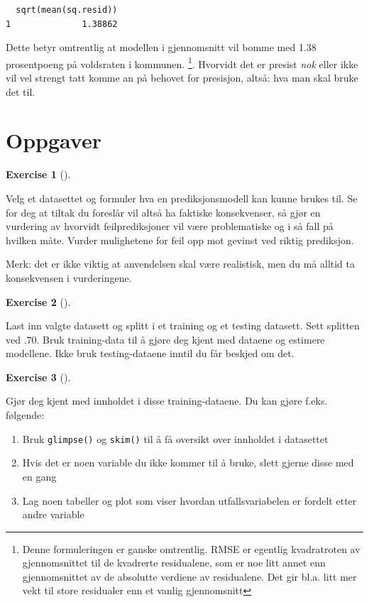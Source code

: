 \documentclass[
  letterpaper,
  DIV=11,
  numbers=noendperiod]{scrreprt}
\providecommand{\tightlist}{%
  \setlength{\itemsep}{0pt}\setlength{\parskip}{0pt}}\usepackage{longtable,booktabs,array}
\theoremstyle{definition}
\newtheorem{exercise}{Exercise}[chapter]
\theoremstyle{remark}
\begin{document}
\begin{verbatim}
  sqrt(mean(sq.resid))
1              1.38862
\end{verbatim}

Dette betyr omtrentlig at modellen i gjennomsnitt vil bomme med 1.38
prosentpoeng på voldsraten i kommunen. \footnote{Denne formuleringen er
  ganske omtrentlig. RMSE er egentlig kvadratroten av gjennomsnittet til
  de kvadrerte residualene, som er noe litt annet enn gjennomsnittet av
  de absolutte verdiene av residualene. Det gir bl.a. litt mer vekt til
  store residualer enn et vanlig gjennomsnitt}. Hvorvidt det er presist
\emph{nok} eller ikke vil vel strengt tatt komme an på behovet for
presisjon, altså: hva man skal bruke det til.

\hypertarget{oppgaver-1}{%
\section{Oppgaver}\label{oppgaver-1}}

\leavevmode{}%
\begin{exercise}[]\label{exr-ols-eksplisitt}

Velg et datasettet og formuler hva en prediksjonsmodell kan kunne brukes
til. Se for deg at tiltak du foreslår vil altså ha faktiske
konsekvenser, så gjør en vurdering av hvorvidt feilprediksjoner vil være
problematiske og i så fall på hvilken måte. Vurder mulighetene for feil
opp mot gevinst ved riktig prediksjon.

Merk: det er ikke viktig at anvendelsen skal være realistisk, men du må
alltid ta konsekvensen i vurderingene.

\end{exercise}

\leavevmode{}%
\begin{exercise}[]\label{exr-split}

Last inn valgte datasett og splitt i et training og et testing datasett.
Sett splitten ved .70. Bruk training-data til å gjøre deg kjent med
dataene og estimere modellene. Ikke bruk testing-dataene inntil du får
beskjed om det.

\end{exercise}

\leavevmode{}%
\begin{exercise}[]\label{exr-sepaa}

Gjør deg kjent med innholdet i disse training-dataene. Du kan gjøre
f.eks. følgende:

\begin{enumerate}
\def\labelenumi{\alph{enumi})}
\tightlist
\item
  Bruk \texttt{glimpse()} og \texttt{skim()} til å få oversikt over
  innholdet i datasettet
\item
  Hvis det er noen variable du ikke kommer til å bruke, slett gjerne
  disse med en gang
\item
  Lag noen tabeller og plot som viser hvordan utfallsvariabelen er
  fordelt etter andre variable
\end{enumerate}

\end{exercise}
\end{document}
